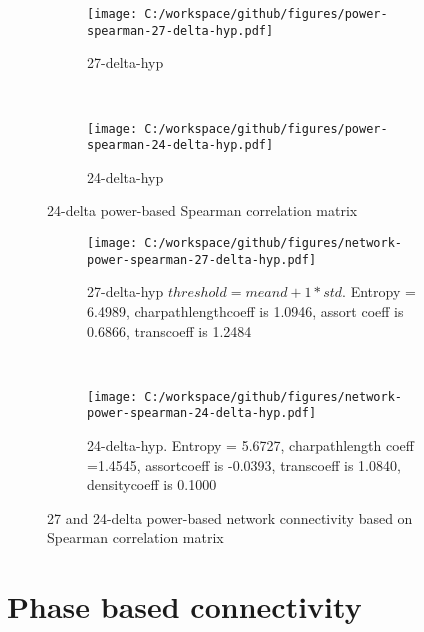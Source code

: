 \documentclass[11pt, onecolumn]{article}
\begin{document}

\begin{figure*}[t!]
    \centering
    \begin{subfigure}[t]{0.5\textwidth}
        \centering
        \texttt{[image: C:/workspace/github/figures/power-spearman-27-delta-hyp.pdf]}
        \caption{27-delta-hyp}
    \end{subfigure}%
    ~ 
    \begin{subfigure}[t]{0.5\textwidth}
        \centering
        \texttt{[image: C:/workspace/github/figures/power-spearman-24-delta-hyp.pdf]}
        \caption{24-delta-hyp}
    \end{subfigure}
        \caption{24-delta power-based Spearman correlation matrix}
\end{figure*}

\begin{figure*}[t!]
    \centering
    \begin{subfigure}[t]{0.5\textwidth}
        \centering
        \texttt{[image: C:/workspace/github/figures/network-power-spearman-27-delta-hyp.pdf]}
        \caption{27-delta-hyp $threshold = meand + 1*std$.  Entropy = 6.4989, charpathlengthcoeff is 1.0946, assort coeff is 0.6866, transcoeff is 1.2484}
    \end{subfigure}%
    ~ 
    \begin{subfigure}[t]{0.5\textwidth}
        \centering
        \texttt{[image: C:/workspace/github/figures/network-power-spearman-24-delta-hyp.pdf]}
        \caption{24-delta-hyp. Entropy = 5.6727, charpathlength coeff =1.4545, assortcoeff is
   -0.0393, transcoeff is
    1.0840, densitycoeff is
    0.1000}
    \end{subfigure}
        \caption{27 and 24-delta power-based network connectivity based on Spearman correlation matrix}
\end{figure*}

\section{Phase based connectivity}
\end{document}
